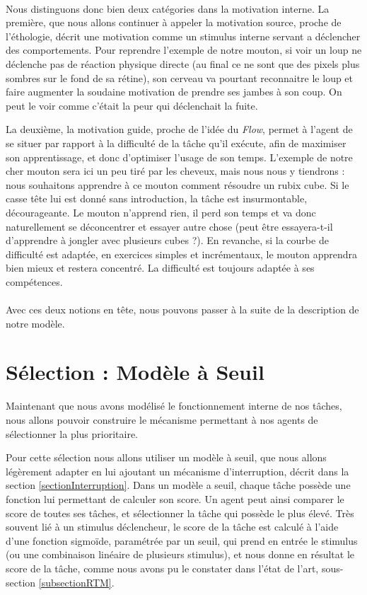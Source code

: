         \paragraph{}
        Nous distinguons donc bien deux catégories dans la motivation interne. La première, que nous allons continuer à appeler la motivation source, proche de l'éthologie, décrit une motivation comme un stimulus interne servant a déclencher des comportements. Pour reprendre l'exemple de notre mouton, si voir un loup ne déclenche pas de réaction physique directe (au final ce ne sont que des pixels plus sombres sur le fond de sa rétine), son cerveau va pourtant reconnaitre le loup et faire augmenter la soudaine motivation de prendre ses jambes à son coup. On peut le voir comme c'était la peur qui déclenchait la fuite.
        
        La deuxième, la motivation guide, proche de l'idée du \textit{Flow}, permet à l'agent de se situer par rapport à la difficulté de la tâche qu'il exécute, afin de maximiser son apprentissage, et donc d'optimiser l'usage de son temps. L'exemple de notre cher mouton sera ici un peu tiré par les cheveux, mais nous nous y tiendrons : nous souhaitons apprendre à ce mouton comment résoudre un rubix cube. Si le casse tête lui est donné sans introduction, la tâche est insurmontable, décourageante. Le mouton n'apprend rien, il perd son temps et va donc naturellement se déconcentrer et essayer autre chose (peut être essayera-t-il d'apprendre à jongler avec plusieurs cubes ?). En revanche, si la courbe de difficulté est adaptée, en exercices simples et incrémentaux, le mouton apprendra bien mieux et restera concentré. La difficulté est toujours adaptée à ses compétences.
        
        \paragraph{}
        Avec ces deux notions en tête, nous pouvons passer à la suite de la description de notre modèle.
			
	\section{Sélection : Modèle à Seuil}
		Maintenant que nous avons modélisé le fonctionnement interne de nos tâches, nous allons pouvoir construire le mécanisme permettant à nos agents de sélectionner la plus prioritaire.
		
			Pour cette sélection nous allons utiliser un modèle à seuil, que nous allons légèrement adapter en lui ajoutant un mécanisme d'interruption, décrit dans la section \ref{sectionInterruption}. Dans un modèle a seuil, chaque tâche possède une fonction lui permettant de calculer son score. Un agent peut ainsi comparer le score de toutes ses tâches, et sélectionner la tâche qui possède le plus élevé. Très souvent lié à un stimulus déclencheur, le score de la tâche est calculé à l'aide d'une fonction sigmoïde, paramétrée par un seuil, qui prend en entrée le stimulus (ou une combinaison linéaire de plusieurs stimulus), et nous donne en résultat le score de la tâche, comme nous avons pu le constater dans l'état de l'art, sous-section \ref{subsectionRTM}.
			

